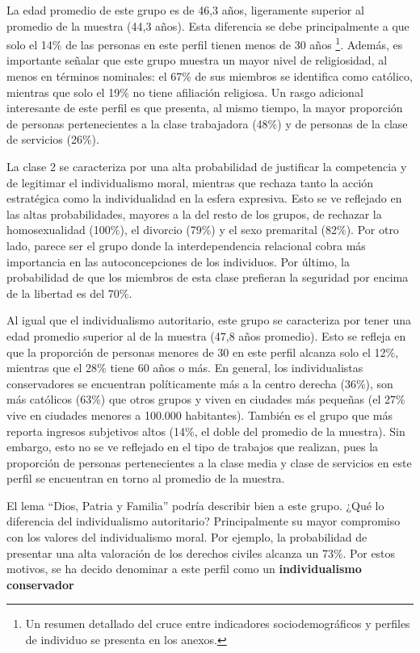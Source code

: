 \documentclass[12pt,twoside]{templates/facsothesis}
\begin{document}
La edad promedio de este grupo es de 46,3 años, ligeramente superior al promedio de la muestra (44,3 años). Esta diferencia se debe principalmente a que solo el 14\% de las personas en este perfil tienen menos de 30 años \footnote{Un resumen detallado del cruce entre indicadores sociodemográficos y perfiles de individuo se presenta en los anexos.}. Además, es importante señalar que este grupo muestra un mayor nivel de religiosidad, al menos en términos nominales: el 67\% de sus miembros se identifica como católico, mientras que solo el 19\% no tiene afiliación religiosa. Un rasgo adicional interesante de este perfil es que presenta, al mismo tiempo, la mayor proporción de personas pertenecientes a la clase trabajadora (48\%) y de personas de la clase de servicios (26\%).

La clase 2 se caracteriza por una alta probabilidad de justificar la competencia y de legitimar el individualismo moral, mientras que rechaza tanto la acción estratégica como la individualidad en la esfera expresiva. Esto se ve reflejado en las altas probabilidades, mayores a la del resto de los grupos, de rechazar la homosexualidad (100\%), el divorcio (79\%) y el sexo premarital (82\%). Por otro lado, parece ser el grupo donde la interdependencia relacional cobra más importancia en las autoconcepciones de los individuos. Por último, la probabilidad de que los miembros de esta clase prefieran la seguridad por encima de la libertad es del 70\%.

Al igual que el individualismo autoritario, este grupo se caracteriza por tener una edad promedio superior al de la muestra (47,8 años promedio). Esto se refleja en que la proporción de personas menores de 30 en este perfil alcanza solo el 12\%, mientras que el 28\% tiene 60 años o más. En general, los individualistas conservadores se encuentran políticamente más a la centro derecha (36\%), son más católicos (63\%) que otros grupos y viven en ciudades más pequeñas (el 27\% vive en ciudades menores a 100.000 habitantes). También es el grupo que más reporta ingresos subjetivos altos (14\%, el doble del promedio de la muestra). Sin embargo, esto no se ve reflejado en el tipo de trabajos que realizan, pues la proporción de personas pertenecientes a la clase media y clase de servicios en este perfil se encuentran en torno al promedio de la muestra.

El lema ``Dios, Patria y Familia'' podría describir bien a este grupo. ¿Qué lo diferencia del individualismo autoritario? Principalmente su mayor compromiso con los valores del individualismo moral. Por ejemplo, la probabilidad de presentar una alta valoración de los derechos civiles alcanza un 73\%. Por estos motivos, se ha decido denominar a este perfil como un \textbf{individualismo conservador}
\end{document}
